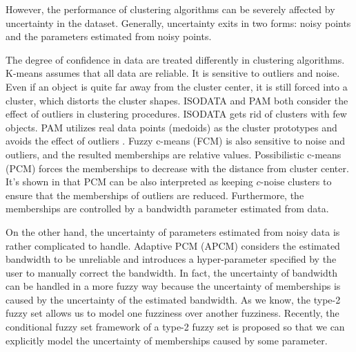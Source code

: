 \documentclass[journal,transmag]{IEEEtran}
\begin{document}
However, the performance of clustering algorithms can be severely affected by uncertainty in the dataset. Generally, uncertainty exits in two forms: noisy points and the parameters estimated from noisy points.

The degree of confidence in data are treated differently in clustering algorithms.
K-means \cite{jain_data_2010} assumes that all data are reliable. It is sensitive to outliers and noise. Even if an object is quite far away from the cluster center, it is still forced into a cluster, which distorts the cluster shapes. ISODATA \cite{ball_clustering_1967} and PAM \cite{kaufman_finding_2009} both consider the effect of outliers in clustering procedures. ISODATA gets rid of clusters with few objects. PAM utilizes real data points (medoids) as the cluster prototypes and avoids the effect of outliers \cite{xu_survey_2005}.
Fuzzy c-means (FCM) \cite{bezdek_pattern_2013} is also sensitive to noise and outliers, and the resulted memberships are relative values.  Possibilistic c-means (PCM) \cite{krishnapuram_possibilistic_1993} forces the memberships to decrease with the distance from cluster center. It's shown in \cite{dave_robust_1997} that PCM can be also interpreted as keeping $c\text{-noise}$ clusters to ensure that the memberships of outliers are reduced. Furthermore, the memberships are controlled by a bandwidth parameter estimated from data.

On the other hand, the uncertainty of parameters estimated from noisy data is rather complicated to handle.
Adaptive PCM (APCM) \cite{xenaki_novel_2016} considers the estimated bandwidth to be unreliable and introduces a hyper-parameter specified by the user to manually correct the bandwidth. In fact, the uncertainty of bandwidth can be handled in a more fuzzy way because the uncertainty of memberships is caused by the uncertainty of the estimated bandwidth.
As we know, the type-2 fuzzy set \cite{zadeh_concept_1975}\cite{mendel_type-2_2002} allows us to model one fuzziness over another fuzziness. Recently, the conditional fuzzy set framework \cite{wang_new_2016} of a type-2 fuzzy set is proposed so that we can explicitly model the uncertainty of memberships caused by some parameter.
\end{document}
